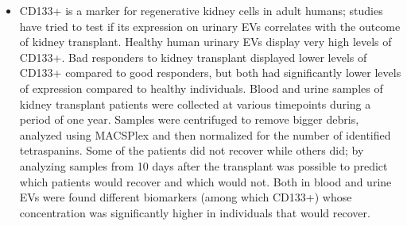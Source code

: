 \begin{itemize}
    \item CD133+ is a marker for regenerative kidney cells in adult humans; studies have tried to test if its expression on urinary EVs correlates with the outcome of kidney transplant. Healthy human urinary EVs display very high levels of CD133+. Bad responders to kidney transplant displayed lower levels of CD133+ compared to good responders, but both had significantly lower levels of expression compared to healthy individuals. Blood and urine samples of kidney transplant patients were collected at various timepoints during a period of one year. Samples were centrifuged to remove bigger debris, analyzed using MACSPlex and then normalized for the number of identified tetraspanins. Some of the patients did not recover while others did; by analyzing samples from 10 days after the transplant was possible to predict which patients would recover and which would not. Both in blood and urine EVs were found different biomarkers (among which CD133+) whose concentration was significantly higher in individuals that would recover. 
  \end{itemize}

